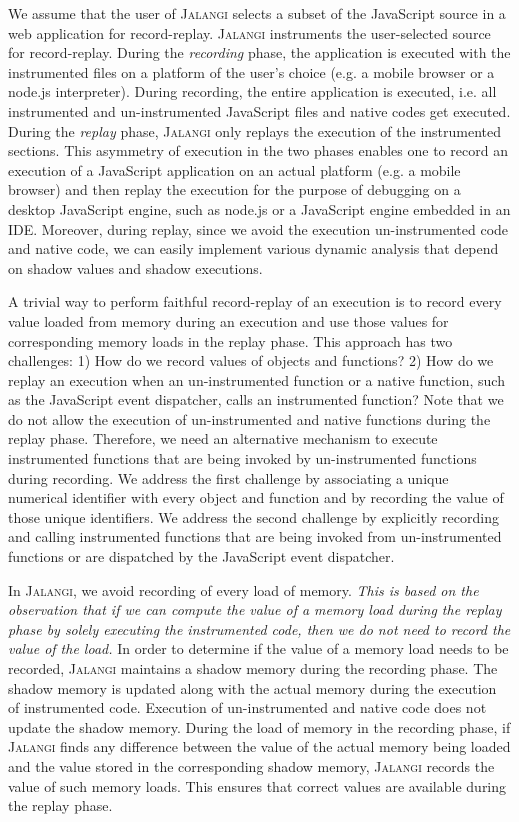 \documentclass{sig-alternate}
\def\jalangi{\textsc{Jalangi}}
\begin{document}
We assume that the user of \jalangi{} selects a subset of the
JavaScript source in a web application for record-replay.  \jalangi{}
instruments the user-selected source for record-replay.  During the
\emph{recording} phase, the application is executed with the
instrumented files on a platform of the user's choice (e.g. a mobile
browser or a node.js interpreter).  During recording, the entire
application is executed, i.e. all instrumented and un-instrumented
JavaScript files and native codes get executed.  During the
\emph{replay} phase, \jalangi{} only replays the execution of the
instrumented sections.  This asymmetry of execution in the two phases
enables one to record an execution of a JavaScript application on an
actual platform (e.g. a mobile browser) and then replay the execution
for the purpose of debugging on a desktop JavaScript engine, such as
node.js or a JavaScript engine embedded in an IDE.  Moreover, during
replay, since we avoid the execution un-instrumented code and native
code, we can easily implement various dynamic analysis that depend on
shadow values and shadow executions.

A trivial way to perform faithful record-replay of an execution is to
record every value loaded from memory during an execution and use
those values for corresponding memory loads in the replay phase.  This
approach has two challenges: 1) How do we record values of objects and
functions?  2) How do we replay an execution when an un-instrumented
function or a native function, such as the JavaScript event
dispatcher, calls an instrumented function?  Note that we do not allow
the execution of un-instrumented and native functions during the
replay phase.  Therefore, we need an alternative mechanism to execute
instrumented functions that are being invoked by un-instrumented
functions during recording.  We address the first challenge by
associating a unique numerical identifier with every object and
function and by recording the value of those unique identifiers.  We
address the second challenge by explicitly recording and calling
instrumented functions that are being invoked from un-instrumented
functions or are dispatched by the JavaScript event dispatcher.


In \jalangi{}, we avoid recording of every load of memory.  \emph{This
  is based on the observation that if we can compute the value of a
  memory load during the replay phase by solely executing the
  instrumented code, then we do not need to record the value of the
  load.}  In order to determine if the value of a memory load needs to
be recorded, \jalangi{} maintains a shadow memory during the recording
phase.  The shadow memory is updated along with the actual memory
during the execution of instrumented code.  Execution of
un-instrumented and native code does not update the shadow memory.
During the load of memory in the recording phase, if \jalangi{} finds
any difference between the value of the actual memory being loaded and
the value stored in the corresponding shadow memory, \jalangi{}
records the value of such memory loads. This ensures that correct
values are available during the replay phase.
\end{document}
